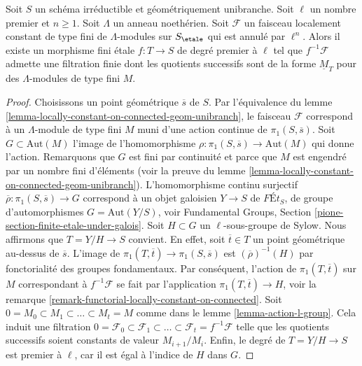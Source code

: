 \begin{lemma}
\label{lemma-pullback-filtered-modules}
Soit $S$ un sch\'ema irr\'eductible et g\'eom\'etriquement unibranche.
Soit $\ell$ un nombre premier et $n \geq 1$. Soit $\Lambda$
un anneau noeth\'erien. Soit $\mathcal{F}$ un faisceau localement
constant de type fini de $\Lambda$-modules sur $S_\etale$
qui est annul\'e par $\ell^n$. Alors il existe un
morphisme fini \'etale $f : T \to S$ de degr\'e premier \`a $\ell$
tel que $f^{-1}\mathcal{F}$ admette une filtration finie dont les
quotients successifs sont de la forme $\underline{M}_T$
pour des $\Lambda$-modules de type fini $M$.
\end{lemma}

\begin{proof}
Choisissons un point g\'eom\'etrique $\overline{s}$ de $S$.
Par l'\'equivalence du
lemme \ref{lemma-locally-constant-on-connected-geom-unibranch},
le faisceau $\mathcal{F}$ correspond \`a un $\Lambda$-module de type fini
$M$ muni d'une action continue de $\pi_1(S, \overline{s})$.
Soit $G \subset \text{Aut}(M)$ l'image de l'homomorphisme
$\rho : \pi_1(S, \overline{s}) \to \text{Aut}(M)$ qui donne l'action.
Remarquons que $G$ est fini par continuit\'e et parce que $M$ est engendr\'e
par un nombre fini d'\'el\'ements (voir la preuve du lemme \ref{lemma-locally-constant-on-connected-geom-unibranch}).
L'homomorphisme continu surjectif
$\overline{\rho} : \pi_1(S, \overline{s}) \to G$
correspond \`a un objet galoisien $Y \to S$ de
$\textit{F\'Et}_S$, de groupe d'automorphismes $G = \text{Aut}(Y/S)$, voir
Fundamental Groups, Section \ref{pione-section-finite-etale-under-galois}.
Soit $H \subset G$ un $\ell$-sous-groupe de Sylow.
Nous affirmons que $T = Y/H \to S$ convient. En effet, soit $\overline{t} \in T$
un point g\'eom\'etrique au-dessus de $\overline{s}$. L'image de
$\pi_1(T, \overline{t}) \to \pi_1(S, \overline{s})$
est $(\overline{\rho})^{-1}(H)$ par fonctorialit\'e
des groupes fondamentaux. Par cons\'equent, l'action de $\pi_1(T, \overline{t})$
sur $M$ correspondant \`a $f^{-1}\mathcal{F}$ se fait par
l'application $\pi_1(T, \overline{t}) \to H$, voir la
remarque \ref{remark-functorial-locally-constant-on-connected}.
Soit $0 = M_0 \subset M_1 \subset \ldots \subset M_t = M$
comme dans le lemme \ref{lemma-action-l-group}.
Cela induit une filtration
$0 = \mathcal{F}_0 \subset \mathcal{F}_1 \subset \ldots
\subset \mathcal{F}_t = f^{-1}\mathcal{F}$
telle que les quotients successifs soient constants de
valeur $M_{i + 1}/M_i$.
Enfin, le degr\'e de $T = Y/H \to S$ est premier \`a $\ell$,
car il est \'egal \`a l'indice de $H$ dans $G$.
\end{proof}






